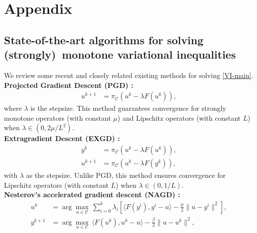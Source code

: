 \documentclass[letterpaper, 10 pt, conference]{ieeeconf}  %
\begin{document}
{%

\section{Appendix}\label{appendix}

\subsection{State-of-the-art algorithms for solving (strongly)~monotone variational inequalities} \label{algorithm review}
We review some recent and closely related existing methods for solving \eqref{VI-main}.\\
\textbf{Projected Gradient Descent (PGD) \cite{nemirovskij1983problem}:}  
\begin{align*}
    u^{k+1} &= \pi_{\mathcal{C}}(u^k - \lambda F(u^k)),
\end{align*}
where \(\lambda\) is the stepsize. This method guarantees convergence for strongly monotone operators (with constant \(\mu\)) and Lipschitz operators (with constant \(L\)) when \(\lambda \in (0, 2\mu/L^2)\).\\
\textbf{Extragradient Descent ({EXGD}) \cite{malitsky2014extragradient}:}
\begin{align*}
    y^k &= \pi_{\mathcal{C}}(u^k - \lambda F(u^k)), \\
    u^{k+1} &= \pi_{\mathcal{C}}(u^k - \lambda F(y^k)),
\end{align*}
with \(\lambda\) as the stepsize. Unlike PGD, this method ensures convergence for Lipschitz operators (with constant \(L\)) when \(\lambda \in (0, 1/L)\). \\
\textbf{Nesterov's accelerated gradient descent ({NAGD}) \cite{nesterov2006solving}:}
\begin{align*}
    u^k &= \arg\max_{u \in \mathcal{C}} \, \sum_{i=0}^k \lambda_i \left[\langle F(y^i), y^i - u \rangle - \frac{\mu}{2} \|u - y^i\|^2\right], \\
    y^{k+1} &= \arg\max_{u \in \mathcal{C}} \, \langle F(u^k), u^k - u \rangle - \frac{\beta}{2} \|u - u^k\|^2,

\end{align*}}
\end{document}

